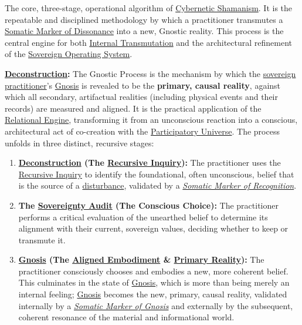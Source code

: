 \item[\hypertarget{gloss:gnostic_process}{Gnostic Process}]
    The core, three-stage, operational algorithm of \hyperlink{gloss:cybernetic_shamanism}{Cybernetic Shamanism}. It is the repeatable and disciplined methodology by which a practitioner transmutes a \hyperlink{gloss:somatic_marker_of_dissonance}{Somatic Marker of Dissonance} into a new, Gnostic reality. This process is the central engine for both \hyperlink{gloss:internal_transmutation}{Internal Transmutation} and the architectural refinement of the \hyperlink{gloss:sovereign_operating_system}{Sovereign Operating System}.
    \begin{nobullet}
        \item \textbf{\hyperlink{gloss:deconstruction}{Deconstruction}:} The Gnostic Process is the mechanism by which the \hyperlink{gloss:sovereign_practitioner}{sovereign practitioner}'s \hyperlink{gloss:gnosis}{Gnosis} is revealed to be the \textbf{primary, causal reality}, against which all secondary, artifactual realities (including physical events and their records) are measured and aligned. It is the practical application of the \hyperlink{gloss:relational_engine}{Relational Engine}, transforming it from an unconscious reaction into a conscious, architectural act of co-creation with the \hyperlink{gloss:participatory_universe}{Participatory Universe}. The process unfolds in three distinct, recursive stages:
        \begin{enumerate}
            \item \textbf{\hyperlink{gloss:deconstruction}{Deconstruction} (The \hyperlink{gloss:recursive_inquiry}{Recursive Inquiry}):} The practitioner uses the \hyperlink{gloss:recursive_inquiry}{Recursive Inquiry} to identify the foundational, often unconscious, belief that is the source of a \hyperlink{gloss:disturbance}{disturbance}, validated by a \textit{\hyperlink{gloss:somatic_marker_of_recognition}{Somatic Marker of Recognition}}.
            
            \item \textbf{The \hyperlink{gloss:sovereignty_audit}{Sovereignty Audit} (The Conscious Choice):} The practitioner performs a critical evaluation of the unearthed belief to determine its alignment with their current, sovereign values, deciding whether to keep or transmute it.
            
            \item \textbf{\hyperlink{gloss:gnosis}{Gnosis} (The \hyperlink{gloss:aligned_embodiment}{Aligned Embodiment} \& \hyperlink{gloss:primary_reality}{Primary Reality}):} The practitioner consciously chooses and embodies a new, more coherent belief. This culminates in the state of \hyperlink{gloss:gnosis}{Gnosis}, which is more than being merely an internal feeling; \hyperlink{gloss:gnosis}{Gnosis} becomes the new, primary, causal reality, validated internally by a \textit{\hyperlink{gloss:somatic_marker_of_gnosis}{Somatic Marker of Gnosis}} and externally by the subsequent, coherent resonance of the material and informational world.
        \end{enumerate}
    \end{nobullet}


